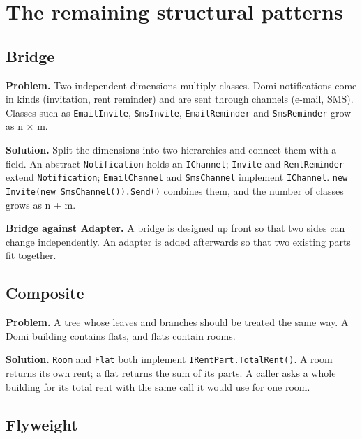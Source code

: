 \documentclass{utmreport}
\providecommand{\passthrough}[1]{#1}
\begin{document}
\chapter{The remaining structural patterns}

\section{Bridge}

\textbf{Problem.} Two independent dimensions multiply classes. Domi notifications come in kinds (invitation, rent reminder) and are sent through channels (e-mail, SMS). Classes such as \passthrough{\lstinline!EmailInvite!}, \passthrough{\lstinline!SmsInvite!}, \passthrough{\lstinline!EmailReminder!} and \passthrough{\lstinline!SmsReminder!} grow as n × m.

\textbf{Solution.} Split the dimensions into two hierarchies and connect them with a field. An abstract \passthrough{\lstinline!Notification!} holds an \passthrough{\lstinline!IChannel!}; \passthrough{\lstinline!Invite!} and \passthrough{\lstinline!RentReminder!} extend \passthrough{\lstinline!Notification!}; \passthrough{\lstinline!EmailChannel!} and \passthrough{\lstinline!SmsChannel!} implement \passthrough{\lstinline!IChannel!}. \passthrough{\lstinline!new Invite(new SmsChannel()).Send()!} combines them, and the number of classes grows as n + m.

\textbf{Bridge against Adapter.} A bridge is designed up front so that two sides can change independently. An adapter is added afterwards so that two existing parts fit together.

\section{Composite}

\textbf{Problem.} A tree whose leaves and branches should be treated the same way. A Domi building contains flats, and flats contain rooms.

\textbf{Solution.} \passthrough{\lstinline!Room!} and \passthrough{\lstinline!Flat!} both implement \passthrough{\lstinline!IRentPart.TotalRent()!}. A room returns its own rent; a flat returns the sum of its parts. A caller asks a whole building for its total rent with the same call it would use for one room.

\section{Flyweight}
\end{document}
